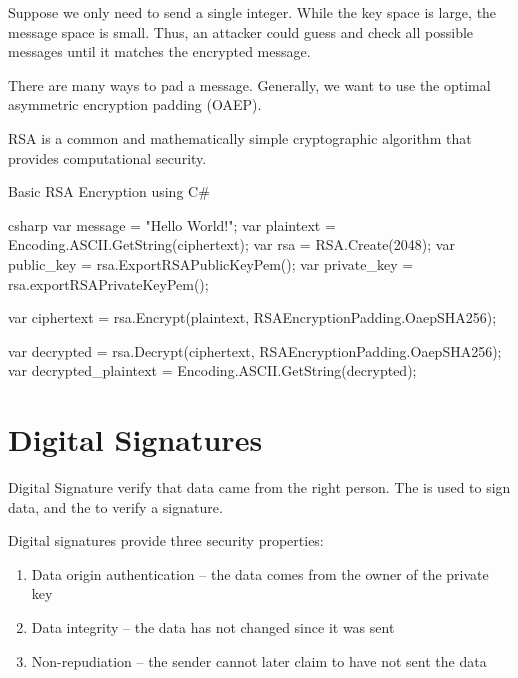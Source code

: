 \documentclass[code]{amznotes}
\begin{document}
Suppose we only need to send a single integer. While the key space is large, the message space is small. Thus, an attacker could guess and check all possible messages until it matches the encrypted message.

There are many ways to pad a message. Generally, we want to use the optimal asymmetric encryption padding (OAEP).

\begin{dfnbox}{RSA}{}
     is a common and mathematically simple cryptographic algorithm that provides computational security.
\end{dfnbox}

\begin{codebox}{Basic RSA Encryption using C\#}{}{}
    \begin{amzcode}{csharp}
        var message = "Hello World!";
        var plaintext = Encoding.ASCII.GetString(ciphertext);
        var rsa = RSA.Create(2048);
        var public_key = rsa.ExportRSAPublicKeyPem();
        var private_key = rsa.exportRSAPrivateKeyPem();

        var ciphertext = rsa.Encrypt(plaintext, RSAEncryptionPadding.OaepSHA256);

        var decrypted = rsa.Decrypt(ciphertext, RSAEncryptionPadding.OaepSHA256);
        var decrypted_plaintext = Encoding.ASCII.GetString(decrypted);
    \end{amzcode}
\end{codebox}

\section{Digital Signatures}

\begin{dfnbox}{Digital Signature}{}
     verify that data came from the right person. The  is used to sign data, and the  to verify a signature.
\end{dfnbox}

Digital signatures provide three security properties:
\begin{enumerate}[noitemsep]
    \item Data origin authentication -- the data comes from the owner of the private key
    \item Data integrity -- the data has not changed since it was sent
    \item Non-repudiation -- the sender cannot later claim to have not sent the data
\end{enumerate}
\end{document}
